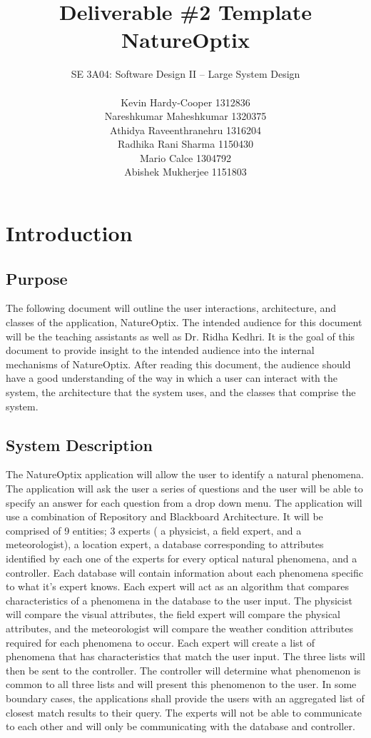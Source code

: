 \documentclass[]{article}
\title{Deliverable \#2 Template \\ NatureOptix}
\author{SE 3A04: Software Design II -- Large System Design \\\\Kevin Hardy-Cooper 1312836\\
		Nareshkumar Maheshkumar 1320375\\
		Athidya Raveenthranehru 1316204\\
		Radhika Rani Sharma	1150430\\
		Mario Calce 1304792\\
		Abishek Mukherjee 1151803}
\date{}
\begin{document}
\maketitle	

\section{Introduction}
\label{sec:introduction}



\subsection{Purpose}
\label{sub:purpose}
\indent\indent The following document will outline the user interactions, architecture, and classes of the application, NatureOptix.  The intended audience for this document will be the teaching assistants as well as Dr. Ridha Kedhri. It is the goal of this document to provide insight to the intended audience into the internal mechanisms of NatureOptix. After reading this document, the audience should have a good understanding of the way in which a user can interact with the system, the architecture that the system uses, and the classes that comprise the system. 

\subsection{System Description}
\label{sub:system_description}

\indent\indent The NatureOptix application will allow the user to identify a natural phenomena. The application will ask the user a series of questions and the user will be able to specify an answer for each question from a drop down menu. The application will use a combination of Repository and Blackboard Architecture. It will be comprised of 9 entities; 3 experts ( a physicist, a field expert, and a meteorologist), a location expert, a database corresponding to attributes identified by each one of the experts for every optical natural phenomena, and a controller. Each database will contain information about each phenomena specific to what it's expert knows. Each expert will act as an algorithm that compares characteristics of a phenomena in the database to the user input. The physicist will compare the visual attributes, the field expert will compare the physical attributes, and the meteorologist will compare the weather condition attributes required for each phenomena to occur. Each expert will create a list of phenomena that has characteristics that match the user input. The three lists will then be sent to the controller. The controller will determine what phenomenon is common to all three lists and will present this phenomenon to the user. In some boundary cases, the applications shall provide the users with an aggregated list of closest match results to their query. The experts will not be able to communicate to each other and will only be communicating with the database and controller. 
\end{document}
